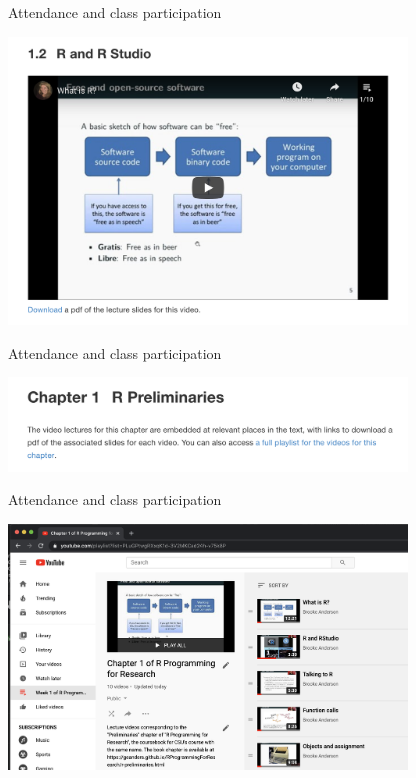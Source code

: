 \documentclass[
  10pt,
  ignorenonframetext,
]{beamer}
\begin{document}
\begin{frame}{Attendance and class participation}
\protect\hypertarget{attendance-and-class-participation-3}{}

\begin{center}\includegraphics[width=300pt]{../figures/video_lecture} \end{center}

\end{frame}

\begin{frame}{Attendance and class participation}
\protect\hypertarget{attendance-and-class-participation-4}{}

\begin{center}\includegraphics[width=300pt]{../figures/playlist_1} \end{center}

\end{frame}

\begin{frame}{Attendance and class participation}
\protect\hypertarget{attendance-and-class-participation-5}{}

\begin{center}\includegraphics[width=300pt]{../figures/playlist_2} \end{center}

\end{frame}
\end{document}
